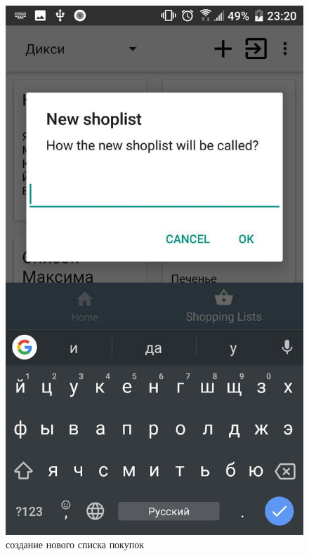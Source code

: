 \begin{figure}[h!]
    \includegraphics[height=0.38\textheight]{./screenshots/3/new_shoplist.jpg}
    \caption{\small{создание нового списка покупок}}
    \endminipage\hfill

\end{figure}

